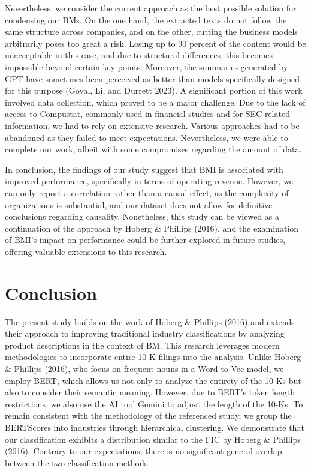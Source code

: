 \documentclass[
]{article}
\begin{document}
Nevertheless, we consider the current approach as the best possible
solution for condensing our BMs. On the one hand, the extracted texts do
not follow the same structure across companies, and on the other,
cutting the business models arbitrarily poses too great a risk. Losing
up to 90 percent of the content would be unacceptable in this case, and
due to structural differences, this becomes impossible beyond certain
key points. Moreover, the summaries generated by GPT have sometimes been
perceived as better than models specifically designed for this purpose
(Goyal, Li, and Durrett 2023). A significant portion of this work
involved data collection, which proved to be a major challenge. Due to
the lack of access to Compustat, commonly used in financial studies and
for SEC-related information, we had to rely on extensive research.
Various approaches had to be abandoned as they failed to meet
expectations. Nevertheless, we were able to complete our work, albeit
with some compromises regarding the amount of data.

In conclusion, the findings of our study suggest that BMI is associated
with improved performance, specifically in terms of operating revenue.
However, we can only report a correlation rather than a causal effect,
as the complexity of organizations is substantial, and our dataset does
not allow for definitive conclusions regarding causality. Nonetheless,
this study can be viewed as a continuation of the approach by Hoberg \&
Phillips (2016), and the examination of BMI's impact on performance
could be further explored in future studies, offering valuable
extensions to this research.

\section{Conclusion}\label{conclusion}

The present study builds on the work of Hoberg \& Phillips (2016) and
extends their approach to improving traditional industry classifications
by analyzing product descriptions in the context of BM. This research
leverages modern methodologies to incorporate entire 10-K filings into
the analysis. Unlike Hoberg \& Phillips (2016), who focus on frequent
nouns in a Word-to-Vec model, we employ BERT, which allows us not only
to analyze the entirety of the 10-Ks but also to consider their semantic
meaning. However, due to BERT's token length restrictions, we also use
the AI tool Gemini to adjust the length of the 10-Ks. To remain
consistent with the methodology of the referenced study, we group the
BERTScores into industries through hierarchical clustering. We
demonstrate that our classification exhibits a distribution similar to
the FIC by Hoberg \& Phillips (2016). Contrary to our expectations,
there is no significant general overlap between the two classification
methods.
\end{document}
